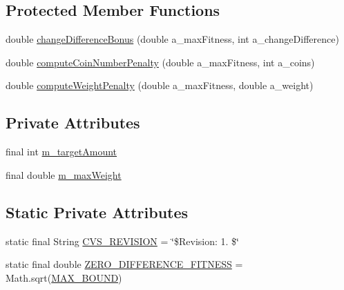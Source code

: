 \subsection*{Protected Member Functions}
\begin{DoxyCompactItemize}
\item 
double \hyperlink{classexamples_1_1energy_1_1_coins_energy_fitness_function_a2524fcb067f71c157f796e4bca796fc4}{change\-Difference\-Bonus} (double a\-\_\-max\-Fitness, int a\-\_\-change\-Difference)
\item 
double \hyperlink{classexamples_1_1energy_1_1_coins_energy_fitness_function_acaae0bc3e2fc761477fec4ac4fa94037}{compute\-Coin\-Number\-Penalty} (double a\-\_\-max\-Fitness, int a\-\_\-coins)
\item 
double \hyperlink{classexamples_1_1energy_1_1_coins_energy_fitness_function_a4a1a52e10d8967624c31f70de102366c}{compute\-Weight\-Penalty} (double a\-\_\-max\-Fitness, double a\-\_\-weight)
\end{DoxyCompactItemize}
\subsection*{Private Attributes}
\begin{DoxyCompactItemize}
\item 
final int \hyperlink{classexamples_1_1energy_1_1_coins_energy_fitness_function_afb63b58598f3772fa2f97c979879b281}{m\-\_\-target\-Amount}
\item 
final double \hyperlink{classexamples_1_1energy_1_1_coins_energy_fitness_function_a079206bf03780d52517c7407ced880fe}{m\-\_\-max\-Weight}
\end{DoxyCompactItemize}
\subsection*{Static Private Attributes}
\begin{DoxyCompactItemize}
\item 
static final String \hyperlink{classexamples_1_1energy_1_1_coins_energy_fitness_function_a3389a0536829e5063a1e0a311a865396}{C\-V\-S\-\_\-\-R\-E\-V\-I\-S\-I\-O\-N} = \char`\"{}\$Revision\-: 1. \$\char`\"{}
\item 
static final double \hyperlink{classexamples_1_1energy_1_1_coins_energy_fitness_function_aa4488040e568b03f30ad220c4425e612}{Z\-E\-R\-O\-\_\-\-D\-I\-F\-F\-E\-R\-E\-N\-C\-E\-\_\-\-F\-I\-T\-N\-E\-S\-S} = Math.\-sqrt(\hyperlink{classexamples_1_1energy_1_1_coins_energy_fitness_function_ac02e8fa7435c47582e6afcd04dd49d89}{M\-A\-X\-\_\-\-B\-O\-U\-N\-D})
\end{DoxyCompactItemize}


